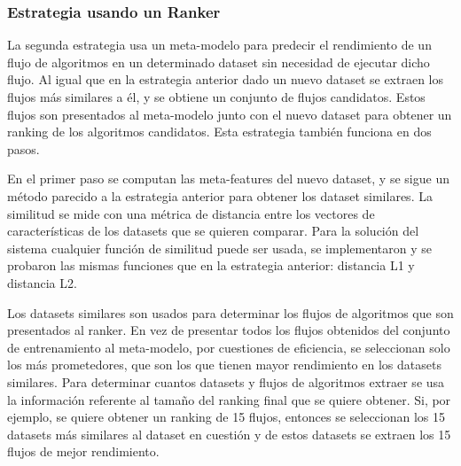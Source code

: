 \subsubsection{Estrategia usando un Ranker}\label{subsub:ranker}


La segunda estrategia usa un meta-modelo para predecir el rendimiento de un flujo de algoritmos en un determinado dataset sin necesidad de ejecutar dicho flujo. Al igual que en la estrategia anterior dado un nuevo dataset se extraen los flujos más similares a él, y se obtiene un conjunto de flujos candidatos. Estos flujos son presentados al meta-modelo junto con el nuevo dataset para obtener un ranking de los algoritmos candidatos. Esta estrategia también funciona en dos pasos.

En el primer paso se computan las meta-features del nuevo dataset, y se sigue un método parecido a la estrategia anterior para obtener los dataset similares. La similitud se mide con una métrica de distancia entre los vectores de características de los datasets que se quieren comparar. Para la solución del sistema cualquier función de similitud puede ser usada, se implementaron y se probaron las mismas funciones que en la estrategia anterior: distancia L1 y distancia L2.

Los datasets similares son usados para determinar los flujos de algoritmos que son presentados al ranker. En vez de presentar todos los flujos obtenidos del conjunto de entrenamiento al meta-modelo, por cuestiones de eficiencia, se seleccionan solo los más prometedores, que son los que tienen mayor rendimiento en los datasets similares. Para determinar cuantos datasets y flujos de algoritmos extraer se usa la información referente al tamaño del ranking final que se quiere obtener. Si, por ejemplo, se quiere obtener un ranking de 15 flujos, entonces se seleccionan los 15 datasets más similares al dataset en cuestión y de estos datasets se extraen los 15 flujos de mejor rendimiento. 

